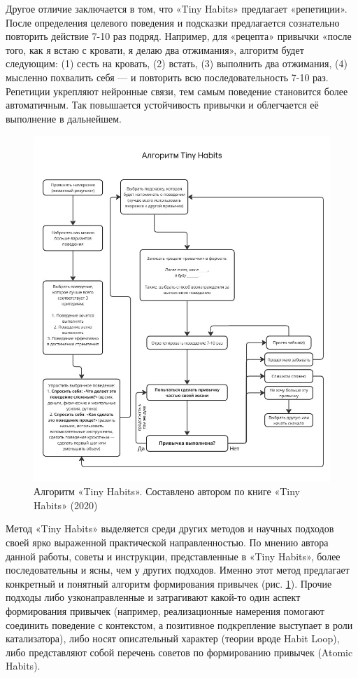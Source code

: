 \documentclass[pdflatex,sn-mathphys-num]{sn-jnl}%
\theoremstyle{thmstyleone}%
\theoremstyle{thmstyletwo}%
\theoremstyle{thmstylethree}%
\begin{document}
Другое отличие заключается в том, что «Tiny Habits» предлагает «репетиции». После определения целевого поведения и подсказки предлагается сознательно повторить действие 7-10 раз подряд. Например, для «рецепта» привычки «после того, как я встаю с кровати, я делаю два отжимания», алгоритм будет следующим: (1) сесть на кровать, (2) встать, (3) выполнить два отжимания, (4) мысленно похвалить себя — и повторить всю последовательность 7-10 раз. Репетиции укрепляют нейронные связи, тем самым поведение становится более автоматичным. Так повышается устойчивость привычки и облегчается её выполнение в дальнейшем.

\begin{figure}[h]
  \centering
  \includegraphics[width=\linewidth]{figures/tiny_habits_alg.jpg}
  \caption{Алгоритм «Tiny Habits». Составлено автором по книге «Tiny Habits» (2020)}
  \label{fig:pic2}
\end{figure}

Метод «Tiny Habits» выделяется среди других методов и научных подходов своей ярко выраженной практической направленностью.  По мнению автора данной работы, советы и инструкции, представленные в «Tiny Habits», более последовательны и ясны, чем у других подходов. Именно этот метод предлагает конкретный и понятный алгоритм формирования привычек (рис. \ref{fig:pic2}). Прочие подходы либо узконаправленные и затрагивают какой-то один аспект формирования привычек (например, реализационные намерения помогают соединить поведение с контекстом, а позитивное подкрепление выступает в роли катализатора), либо носят описательный характер (теории вроде Habit Loop), либо представляют собой перечень советов по формированию привычек (Atomic Habits).
\end{document}
